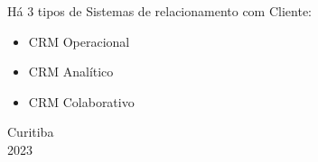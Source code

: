 \documentclass[12pt, a4paper]{article}
\begin{document}
{\noindent
Há 3 tipos de Sistemas de relacionamento com Cliente:

\begin{itemize}
    \item CRM Operacional
    \item CRM Analítico
    \item CRM Colaborativo 
\end{itemize}

\vfill
\begin{center}
    Curitiba\\
    2023
\end{center}

}
\end{document}
